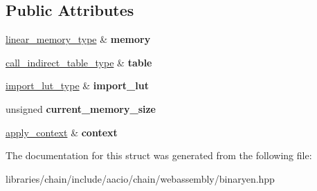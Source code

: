 \subsection*{Public Attributes}
\begin{DoxyCompactItemize}
\item 
\mbox{\label{structaacio_1_1chain_1_1webassembly_1_1binaryen_1_1interpreter__interface_a7cc90e6cea62636f5c565be541917230}} 
\mbox{\hyperlink{classfc_1_1array}{linear\+\_\+memory\+\_\+type}} \& {\bfseries memory}
\item 
\mbox{\label{structaacio_1_1chain_1_1webassembly_1_1binaryen_1_1interpreter__interface_a33490dc61abcdb8b32fd86e99599b302}} 
\mbox{\hyperlink{classstd_1_1vector}{call\+\_\+indirect\+\_\+table\+\_\+type}} \& {\bfseries table}
\item 
\mbox{\label{structaacio_1_1chain_1_1webassembly_1_1binaryen_1_1interpreter__interface_aef7a3f7b355bff1673c6c3a4e4a4a4e7}} 
\mbox{\hyperlink{classstd_1_1unordered__map}{import\+\_\+lut\+\_\+type}} \& {\bfseries import\+\_\+lut}
\item 
\mbox{\label{structaacio_1_1chain_1_1webassembly_1_1binaryen_1_1interpreter__interface_aeda14f2d32c9df6c8e998a723be000dc}} 
unsigned {\bfseries current\+\_\+memory\+\_\+size}
\item 
\mbox{\label{structaacio_1_1chain_1_1webassembly_1_1binaryen_1_1interpreter__interface_a1c2cb6ce0ddc6ee06ccddb6a6c74da65}} 
\mbox{\hyperlink{classaacio_1_1chain_1_1apply__context}{apply\+\_\+context}} \& {\bfseries context}
\end{DoxyCompactItemize}


The documentation for this struct was generated from the following file\+:\begin{DoxyCompactItemize}
\item 
libraries/chain/include/aacio/chain/webassembly/binaryen.\+hpp\end{DoxyCompactItemize}
